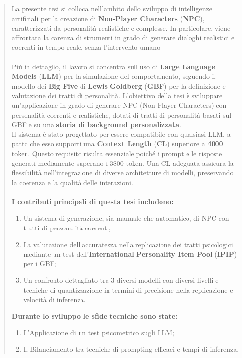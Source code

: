 \begin{abstract}
La presente tesi si colloca nell'ambito dello sviluppo di intelligenze artificiali per la creazione di \textbf{Non-Player Characters} (\textbf{NPC})\cite{nextgen1996}, caratterizzati da personalità realistiche e complesse. In particolare, viene affrontata la carenza di strumenti in grado di generare dialoghi realistici e coerenti in tempo reale, senza l'intervento umano.\\\\
Più in dettaglio, il lavoro si concentra sull'uso di \textbf{Large Language Models} (\textbf{LLM})\cite{brown1993mathematics} per la simulazione del comportamento, seguendo il modello dei \textbf{Big Five} di \textbf{Lewis Goldberg} (\textbf{GBF})\cite{goldberg1992} per la definizione e valutazione dei tratti di personalità.
L'obiettivo della tesi è sviluppare un'applicazione in grado di generare NPC (Non-Player-Characters) con personalità coerenti e realistiche, dotati di tratti di personalità basati sul GBF e su una \textbf{storia di background personalizzata}.\\
Il sistema è stato progettato per essere compatibile con qualsiasi LLM, a patto che esso supporti una \textbf{Context Length} (\textbf{CL}) superiore a \textbf{4000} token. Questo requisito risulta essenziale poiché i prompt e le risposte generati mediamente superano i 3800 token. Una CL adeguata assicura la flessibilità nell'integrazione di diverse architetture di modelli, preservando la coerenza e la qualità delle interazioni.\\\\
\textbf{I contributi principali di questa tesi includono:}
\begin{enumerate}
    \item Un sistema di generazione, sia manuale che automatico, di NPC con tratti di personalità coerenti;
    \item La valutazione dell'accuratezza nella replicazione dei tratti psicologici mediante un test dell'\textbf{International Personality Item Pool} (\textbf{IPIP})\cite{goldberg2006} per i GBF;
    \item Un confronto dettagliato tra 3 diversi modelli con diversi livelli e tecniche di quantizzazione in termini di precisione nella replicazione e velocità di inferenza.
\end{enumerate}

\textbf{Durante lo sviluppo le sfide tecniche sono state:}
\begin{enumerate}
    \item L'Applicazione di un test psicometrico sugli LLM;
    \item Il Bilanciamento tra tecniche di prompting efficaci e tempi di inferenza.
\end{enumerate}
\end{abstract} 